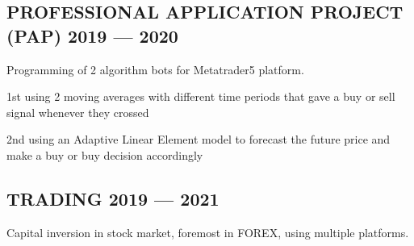 \documentclass[letter,10pt]{article}
\begin{document}
\subsection{{PROFESSIONAL APPLICATION PROJECT (PAP) \hfill  2019 --- 2020}}
\begin{zitemize}
\item Programming of 2 algorithm bots for Metatrader5 platform.
\item 1st using 2 moving averages with different time periods that gave a buy or sell signal whenever they crossed
\item 2nd using an Adaptive Linear Element model to forecast the future price and make a buy or buy decision accordingly
\end{zitemize}

\subsection{{TRADING \hfill  2019 --- 2021}}
\begin{zitemize}
\item Capital inversion in stock market, foremost in FOREX, using multiple platforms.
\end{zitemize}
\end{document}
